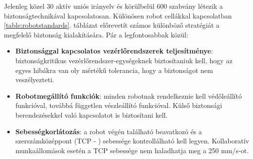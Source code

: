 \documentclass[../documentation.tex]{subfiles}
\begin{document}
\begin{table}[h!]
  \centering
\end{table}

Jelenleg közel 30 aktív uniós irányelv és körülbelül 600 szabvány létezik a biztonságtechnikával kapcsolatosan. Különösen robot cellákkal kapcsolatban \ref{table:robotstandards}. táblázat előrevetít számos különböző stratégiát a megfelelő biztonság kialakítására. Pár a legfontosabbak közül\cite{safehrc}:
\begin{itemize}
	\item \textbf{Biztonsággal kapcsolatos vezérlőrendszerek teljesítménye}: biztonságkritikus vezérlőrendszer-egységeknek biztosítaniuk kell, hogy az egyes hibákra van oly mértékű tolerancia, hogy a biztonságot nem veszélyezteti.
	\item \textbf{Robotmegállító funkciók}: minden robotnak rendelkeznie kell védőleállító funkcióval, továbbá független vészleállító funkcióval. Külső biztonsági berendezésekkel való kapcsolatot is biztosítani kell.
	\item \textbf{Sebességkorlátozás}: a robot végén található beavatkozó és a szerszámközéppont (TCP - ) sebessége kontrollálható kell legyen. Kollaboratív munkaállomások esetén a TCP sebessége nem haladhatja meg a 250 mm/s-ot.
\end{itemize}
\end{document}
